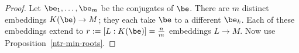 \begin{proof}
Let $\be_1,\ldots, \be_m$ be the conjugates of $\be$. There are $m$ distinct embeddings $K(\be)\to M$; they each take $\be$ to a different $\be_k$. Each of these embeddings extend to $r:=[L:K(\be)]=\frac{n}{m}$ embeddings $L\to M$. %
Now use Proposition~\ref{ntr-min-roots}.
\end{proof}

